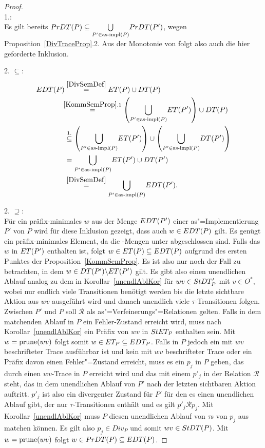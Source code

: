 \begin{proof}\mbox{}\\
  1.:\\
  Es gilt bereits $PrDT (P) \subseteq \underset{P'\in\mathrm{as}\text{-}\mathrm{impl} (P)}{\bigcup}
  PrDT (P')$, wegen Proposition~\ref{DivTraceProp}.2. Aus der Monotonie
  von \cont{} folgt also auch die hier geforderte Inklusion.

  2. \glqq$\subseteq$\grqq{}:
  {\allowdisplaybreaks
  \begin{align*}
    \EDT (P)&\overset{\ref{DivSemDef}}{=} \ET (P)\cup \DT (P)\\
    &\hspace{-0.15cm}\overset{\ref{KommSemProp}.1}{=} \left(\underset{P'\in
    \asimp (P)}{\bigcup} \ET (P')\right)\cup \DT (P)\\
    &\overset{1.}{\subseteq} \left(\underset{P'\in
    \asimp (P)}{\bigcup} \ET (P')\right)\cup \left(\underset{P'\in \asimp
    (P)}{\bigcup} \DT (P')\right)\\
    &= \underset{P'\in \asimp (P)}{\bigcup} \ET (P') \cup \DT (P')\\
    &\overset{\ref{DivSemDef}}{=} \underset{P'\in\asimp (P)}{\bigcup} \EDT
    (P').
  \end{align*}}

  2. \glqq$\supseteq$\grqq{}:\\
  Für ein präfix-minimales $w$ aus der Menge $EDT (P')$ einer
  as"=Implementierung $P'$ von $P$ wird für diese Inklusion gezeigt, dass auch
  $w\in EDT (P)$ gilt. Es genügt ein präfix-minimales Element, da die
  \EDT{}-Mengen unter \cont{} abgeschlossen sind. Falls das $w$ in $ET (P')$
  enthalten ist, folgt $w\in ET (P) \subseteq EDT (P)$ aufgrund des ersten
  Punktes der Proposition~\ref{KommSemProp}. Es ist also nur noch der Fall zu
  betrachten, in dem $w\in DT (P') \backslash ET (P')$ gilt. Es gibt also
  einen unendlichen Ablauf analog zu dem in Korollar~\ref{unendlAblKor} für $wv
  \in StDT _P'$ mit $v\in O^*$, wobei nur endlich viele Transitionen benötigt
  werden bis die letzte sichtbare Aktion aus $wv$ ausgeführt wird und danach
  unendlich viele $\tau$-Transitionen folgen. Zwischen $P'$ und $P$ soll
  $\mathcal{R}$ als as"=Verfeinerungs"=Relationen gelten. Falls in dem
  matchenden Ablauf in $P$ ein Fehler-Zustand erreicht wird, muss nach
  Korollar~\ref{unendlAblKor} ein Präfix von $wv$ in $StET _P$ enthalten sein.
  Mit $w=\mathrm{prune} (wv)$ folgt somit $w\in ET _P \subseteq EDT _P$. Falls in $P$
  jedoch ein mit $wv$ beschrifteter Trace ausführbar ist und kein mit $wv$
  beschrifteter Trace oder ein Präfix davon einen Fehler"=Zustand erreicht,
  muss es ein $p_j$ in $P$ geben, das durch einen $wv$-Trace in $P$ erreicht
  wird und das mit einem $p'_j$ in der Relation $\mathcal{R}$ steht, das in
  dem unendlichen Ablauf von $P'$ nach der letzten sichtbaren Aktion auftritt.
  $p'_j$ ist also ein divergenter Zustand für $P'$ für den es einen unendlichen
  Ablauf gibt, der nur $\tau$-Transitionen enthält und es gilt $p'_j\mathcal{R}
  p_j$. Mit Korollar~\ref{unendlAblKor} muss $P$ diesen unendlichen Ablauf von
  $\tau$s von $p_j$ aus matchen können. Es gilt also $p_j\in Div _P$ und somit
  $wv\in StDT (P)$. Mit $w=\mathrm{prune} (wv)$ folgt $w\in PrDT (P) \subseteq EDT
  (P)$.


\end{proof}
